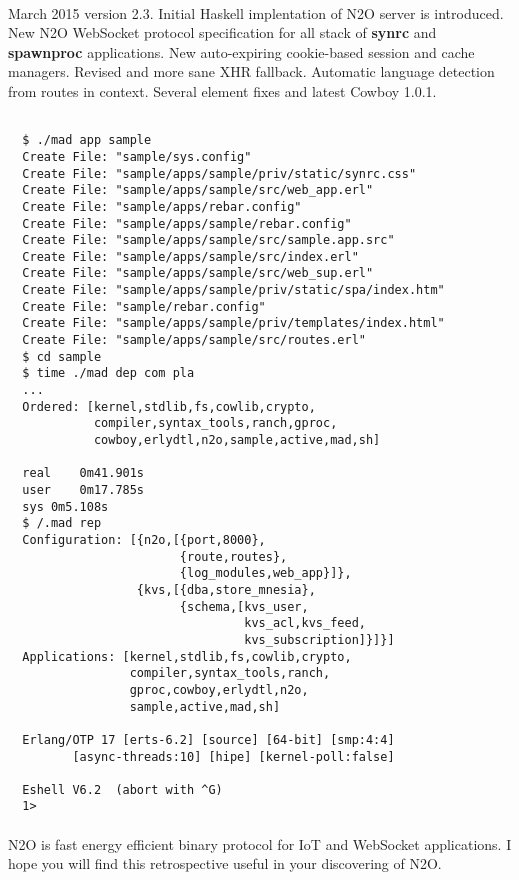 \paragraph{}
March 2015 version 2.3. Initial Haskell implentation of N2O server is introduced.
New N2O WebSocket protocol specification for all stack of {\bf synrc} and {\bf spawnproc} applications.
New auto-expiring cookie-based session and cache managers. Revised and more sane XHR fallback.
Automatic language detection from routes in context.
Several element fixes and latest Cowboy 1.0.1.

\newpage
\begin{lstlisting}[caption=Bootstraping in a minute]

  $ ./mad app sample
  Create File: "sample/sys.config"
  Create File: "sample/apps/sample/priv/static/synrc.css"
  Create File: "sample/apps/sample/src/web_app.erl"
  Create File: "sample/apps/rebar.config"
  Create File: "sample/apps/sample/rebar.config"
  Create File: "sample/apps/sample/src/sample.app.src"
  Create File: "sample/apps/sample/src/index.erl"
  Create File: "sample/apps/sample/src/web_sup.erl"
  Create File: "sample/apps/sample/priv/static/spa/index.htm"
  Create File: "sample/rebar.config"
  Create File: "sample/apps/sample/priv/templates/index.html"
  Create File: "sample/apps/sample/src/routes.erl"
  $ cd sample
  $ time ./mad dep com pla
  ...
  Ordered: [kernel,stdlib,fs,cowlib,crypto,
            compiler,syntax_tools,ranch,gproc,
            cowboy,erlydtl,n2o,sample,active,mad,sh]

  real    0m41.901s
  user    0m17.785s
  sys 0m5.108s
  $ /.mad rep
  Configuration: [{n2o,[{port,8000},
                        {route,routes},
                        {log_modules,web_app}]},
                  {kvs,[{dba,store_mnesia},
                        {schema,[kvs_user,
                                 kvs_acl,kvs_feed,
                                 kvs_subscription]}]}]
  Applications: [kernel,stdlib,fs,cowlib,crypto,
                 compiler,syntax_tools,ranch,
                 gproc,cowboy,erlydtl,n2o,
                 sample,active,mad,sh]

  Erlang/OTP 17 [erts-6.2] [source] [64-bit] [smp:4:4]
         [async-threads:10] [hipe] [kernel-poll:false]

  Eshell V6.2  (abort with ^G)
  1>
\end{lstlisting}

\paragraph{}
N2O is fast energy efficient binary protocol for IoT and WebSocket applications.
I hope you will find this retrospective useful in your discovering of N2O.

